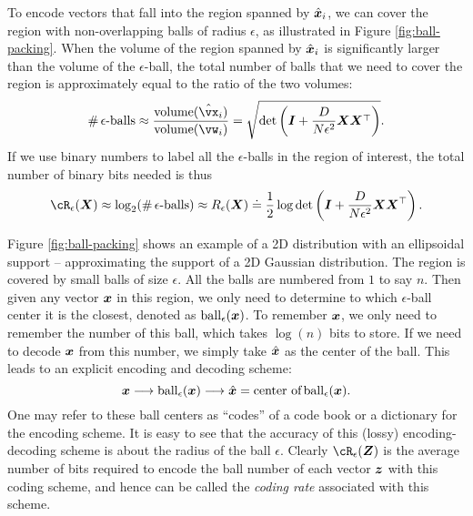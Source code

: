 \documentclass[../../book-main.tex]{subfiles}
\begin{document}
To encode vectors that fall into the region spanned by $\hat {\bm{x}}_i$, we can cover the region with non-overlapping
balls of radius $\epsilon$, as illustrated in Figure \ref{fig:ball-packing}. When the volume of the region spanned by $\hat {\bm{x}}_i$ is significantly larger than the volume of the $\epsilon$-ball, the total number of balls that we need to cover the region is
approximately equal to the ratio of the two volumes:
\begin{equation}
	\# \,\epsilon\mbox{-balls} \approx \frac{\mbox{volume}(\hat \vx_i)}{\mbox{volume}(\vw_i)} = \sqrt{\det\left(\boldsymbol{I} + \frac{D}{N\epsilon^2} \X\X^\top  \right)}.
\end{equation}
If we use binary numbers to label all the $\epsilon$-balls in the region of
interest, the total number of binary bits needed is thus %
\begin{equation} 
	\cR_{\epsilon}(\X) \approx %
	\log_2 (\# \,\epsilon\mbox{-balls}) \approx R_{\epsilon}(\X) \doteq \frac{1}{2} \log \det \left(\boldsymbol{I} + \frac{D}{N\epsilon^2} \X\X^\top \right).
	\label{eqn:rate-Gaussian}
\end{equation}

\begin{example}
	Figure \ref{fig:ball-packing} shows an example of a 2D distribution with an ellipsoidal support -- approximating the support of a 2D Gaussian distribution. The region is covered by small balls of size $\epsilon$. All the balls are numbered from $1$ to say $n$. Then given any vector $\bm{x}$ in this region, we
	only need to determine to which $\epsilon$-ball center it is the closest, denoted as $\operatorname{ball}_{\epsilon}(\bm{x})$. To remember $\bm{x}$, we only need to remember the number of this ball, which takes $\log(n)$ bits to store. If we need to decode $\bm{x}$ from this number, we simply take $\hat {\bm{x}}$ as the center of the ball. This leads to an explicit encoding and decoding scheme:
	\begin{equation}
		\bm{x} \longrightarrow \operatorname{ball}_{\epsilon}(\bm{x}) \longrightarrow \hat {\bm{x}} = \mbox{center of} \operatorname{ball}_{\epsilon}(\bm{x}).
	\end{equation}
	One may refer to these ball centers as  ``codes'' of a code book or a dictionary for the encoding scheme. It is easy to see that the accuracy of this (lossy) encoding-decoding scheme is about the radius of the ball $\epsilon$. 
	Clearly $\cR_{\epsilon}(\Z)$ is the average
	number of bits required to encode the ball number of each vector $\bm{z}$ with
	this coding scheme, and hence can be called the {\em coding rate} associated with this scheme.
\end{example}
\end{document}
